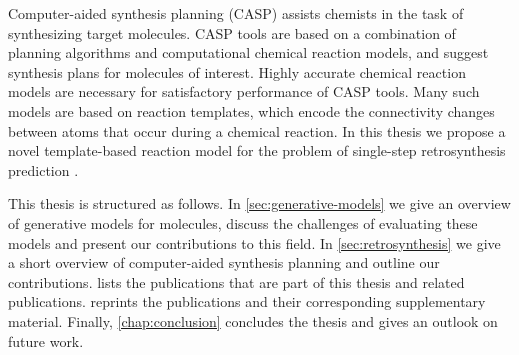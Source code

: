 Computer-aided synthesis planning (CASP) assists chemists in the task of
synthesizing target molecules. CASP tools are based on a combination of planning
algorithms and computational chemical reaction models, and suggest synthesis
plans for molecules of interest. Highly accurate chemical reaction models are
necessary for satisfactory performance of CASP tools. Many such models are based
on reaction templates, which encode the connectivity changes between atoms that
occur during a chemical reaction. In this thesis we propose a novel
template-based reaction model for the problem of single-step retrosynthesis
prediction \citep{todo}. 

This thesis is structured as follows. In \cref{sec:generative-models} we give 
an overview of generative models for molecules, discuss the challenges of evaluating
these models and present our contributions to this field. In \cref{sec:retrosynthesis}
we give a short overview of computer-aided synthesis planning and outline our contributions. 
 lists the publications that are part of this thesis and 
related publications.  reprints the publications
and their corresponding supplementary material. Finally, \cref{chap:conclusion} concludes
the thesis and gives an outlook on future work.





